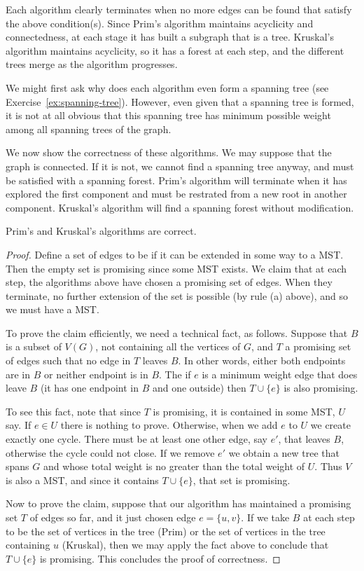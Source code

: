 Each algorithm clearly terminates when no more edges can be found that
satisfy the above condition(s). Since Prim's algorithm maintains
acyclicity and connectedness, at each stage it has built a subgraph that
is a tree. Kruskal's algorithm maintains acyclicity, so it has a forest at each step, and the different trees merge as the algorithm progresses.

We might first ask why does each algorithm even form a spanning tree (see
Exercise~\ref{ex:spanning-tree}). However, even given that a spanning tree is formed, it is not at all obvious that this spanning tree has minimum possible weight among all spanning trees of the graph.

We now show the correctness of these algorithms. We may suppose that the
graph is connected. If it is not, we cannot find a spanning tree anyway,
and must be satisfied with a spanning forest. Prim's algorithm will
terminate when it has explored the first component and must be
restrated from a new root in another component. Kruskal's algorithm
will find a spanning forest without modification.

\begin{Theorem}
\label{thm:prim-kruskal}
Prim's and Kruskal's algorithms are correct.
\end{Theorem}

\begin{proof}
Define a set of edges to be  if it can be
extended in some way to a MST. Then the empty set is promising since
some MST exists. We claim that at each step, the algorithms above have
chosen a promising set of edges. When they terminate, no further
extension of the set  is possible (by rule (a) above), and so we must
have a MST.

To prove the claim efficiently, we need a technical fact, as follows.
Suppose that $B$ is a subset of $V(G)$, not containing all the vertices
of $G$, and $T$ a promising set of edges such that no edge in $T$ leaves
$B$. In other words, either both endpoints are in $B$ or neither
endpoint is in $B$. The if $e$ is a minimum weight edge that does leave
$B$ (it has one endpoint in $B$ and one outside) then $T\cup\{e\}$ is
also promising.

To see this fact, note that since $T$ is promising, it is contained in
some MST, $U$ say. If $e\in U$ there is nothing to prove. Otherwise,
when we add $e$ to $U$ we create exactly one cycle. There must be at
least one other edge, say $e'$, that leaves $B$, otherwise the cycle
could not close. If we remove $e'$ we obtain a new tree that spans $G$
and whose total weight is no greater than the total weight of $U$. Thus
$V$ is also a MST, and since it contains $T\cup\{e\}$, that set is
promising.

Now to prove the claim, suppose that our algorithm has maintained a
promising set $T$ of edges so far, and it just chosen edge $e=\{u,v\}$.
If we take $B$ at each step to be the set of vertices in the tree (Prim)
or the set of vertices in the tree containing $u$ (Kruskal), then we may
apply the fact above to conclude that $T \cup \{e\}$ is promising. This
concludes the proof of correctness.

\end{proof}

